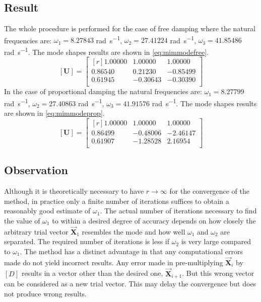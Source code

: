 \subsection{Result}
\label{ssec:resultmim}
The whole procedure is performed for the case of free damping where the natural
frequencies are: \(\omega_{1} = 8.27843\) \si{\radian\per\second}, \(\omega_{2}
= 27.41224\) \si{\radian\per\second}, \(\omega_{3} = 41.85486\)
\si{\radian\per\second}.
The mode shapes results are shown in \eqref{eq:mimmodefree}.
\begin{equation}\label{eq:mimmodefree}
 [\mathbf{U}] = \begin{bmatrix*}[r]
	1.00000 & 1.00000 & 1.00000 \\
	0.86540 & 0.21230 &-0.85499 \\
	0.61945 &-0.30643 &-0.30390 \\
	 \end{bmatrix*}
\end{equation}
%
In the case of proportional damping the natural frequencies are:
\(\omega_{1} = 8.27799\) \si{\radian\per\second}, \(\omega_{2} = 27.40863\)
\si{\radian\per\second}, \(\omega_{3} = 41.91576\) \si{\radian\per\second}.
The mode shapes results are shown in \eqref{eq:mimmodeprop}.
 \begin{equation}\label{eq:mimmodeprop}
 [\mathbf{U}] = \begin{bmatrix*}[r]
	1.00000 & 1.00000 & 1.00000 \\
	0.86499 &-0.48006 &-2.46147 \\
	0.61907 &-1.28528 & 2.16954 \\
	 \end{bmatrix*}
\end{equation}
\subsection{Observation}\label{ssec:observationmim}
Although it is theoretically necessary to have \(r\rightarrow\infty\) for the 
convergence of the method, in practice only a finite number of iterations
suffices to obtain a reasonably good estimate of \(\omega_{1}\).
The actual number of iterations necessary to find the value of \(\omega_1\) to
within a desired degree of accuracy depends on how closely the arbitrary trial
vector \(\vec{\mathbf{X}}_{1}\) resembles the mode and how well \(\omega_1\)
and \(\omega_2\) are separated.
The required number of iterations is less if \(\omega_2\) is very large compared
to \(\omega_{1}\).
The method has a distinct advantage in that any computational errors made do not
yield incorrect results. Any error made in pre-multiplying
\(\vec{\mathbf{X}}_{i}\) by \([D]\) results in a vector other than the desired
one, \(\vec{\mathbf{X}}_{i+1}\).
But this wrong vector can be considered as a new trial vector.
This may delay the convergence but does not produce wrong results.
